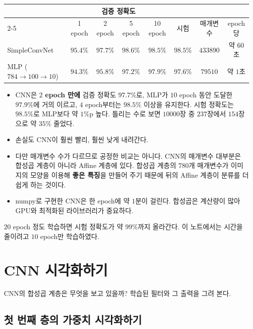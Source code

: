 \documentclass[11pt,a4paper]{article}
\begin{document}
\begin{center}
{\small
\begin{tabular}{@{}lccccccc@{}}
\toprule
& \multicolumn{4}{c}{검증 정확도} & & & \\
\cmidrule(lr){2-5}
& 1 epoch & 2 epoch & 5 epoch & 10 epoch & 시험 & 매개변수 & epoch당 \\
\midrule
SimpleConvNet & $95.4\%$ & $97.7\%$ & $98.6\%$ & $98.5\%$ & $\mathbf{98.5\%}$ & $433890$ & 약 $60$초 \\
MLP ($784\to100\to10$) & $94.3\%$ & $95.8\%$ & $97.2\%$ & $97.9\%$ & $97.6\%$ & $79510$ & 약 $1$초 \\
\bottomrule
\end{tabular}}
\end{center}

\begin{itemize}[leftmargin=1.8em]
\item CNN은 \textbf{$2$ epoch 만에} 검증 정확도 $97.7\%$로, MLP가 $10$ epoch 동안 도달한 $97.9\%$에 거의 이르고, $4$ epoch부터는 $98.5\%$ 이상을 유지한다.
시험 정확도는 $98.5\%$로 MLP보다 약 $1\%$p 높다. 틀리는 수로 보면 $10000$장 중 $237$장에서 $154$장으로 약 $35\%$ 줄었다.
\item 손실도 CNN이 훨씬 빨리, 훨씬 낮게 내려간다.
\item 다만 매개변수 수가 다르므로 공정한 비교는 아니다. CNN의 매개변수 대부분은 합성곱 계층이 아니라 Affine 계층에 있다.
합성곱 계층의 $780$개 매개변수가 이미지의 모양을 이용해 \textbf{좋은 특징}을 만들어 주기 때문에
뒤의 Affine 계층이 분류를 더 쉽게 하는 것이다.
\item numpy로 구현한 CNN은 한 epoch에 약 $1$분이 걸린다. 합성곱은 계산량이 많아 GPU와 최적화된 라이브러리가 중요하다.
\end{itemize}

$20$ epoch 정도 학습하면 시험 정확도가 약 $99\%$까지 올라간다.
이 노트에서는 시간을 줄이려고 $10$ epoch만 학습하였다.

\section{CNN 시각화하기}\label{sec:visual}

CNN의 합성곱 계층은 무엇을 보고 있을까? 학습된 필터와 그 출력을 그려 본다.

\subsection{첫 번째 층의 가중치 시각화하기}\label{sec:filters}
\end{document}
